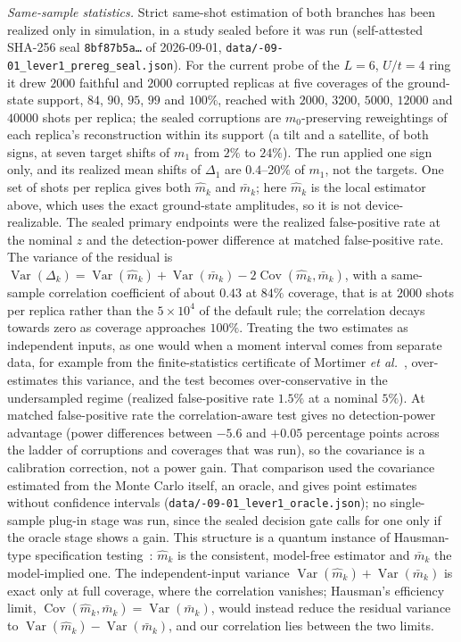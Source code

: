 \documentclass[aps,prb,onecolumn,superscriptaddress,longbibliography,floatfix]{revtex4-2}
\begin{document}
\emph{Same-sample statistics.} Strict same-shot estimation of both branches has been realized only in simulation, in a study sealed before it was run (self-attested SHA-256 seal \texttt{8bf87b5a\ldots} of 2026-09-01, \texttt{data/-09-01\_\allowbreak lever1\_\allowbreak prereg\_seal.json}). For the current probe of the $L=6$, $U/t=4$ ring it drew $2000$ faithful and $2000$ corrupted replicas at five coverages of the ground-state support, $84$, $90$, $95$, $99$ and $100\%$, reached with $2000$, $3200$, $5000$, $12000$ and $40000$ shots per replica; the sealed corruptions are $m_0$-preserving reweightings of each replica's reconstruction within its support (a tilt and a satellite, of both signs, at seven target shifts of $m_1$ from $2\%$ to $24\%$). The run applied one sign only, and its realized mean shifts of $\Delta_1$ are $0.4$--$20\%$ of $m_1$, not the targets. One set of shots per replica gives both $\widehat m_k$ and $\bar m_k$; here $\widehat m_k$ is the local estimator above, which uses the exact ground-state amplitudes, so it is not device-realizable. The sealed primary endpoints were the realized false-positive rate at the nominal $z$ and the detection-power difference at matched false-positive rate. The variance of the residual is $\operatorname{Var}(\Delta_k)=\operatorname{Var}(\widehat m_k)+\operatorname{Var}(\bar m_k)-2\operatorname{Cov}(\widehat m_k,\bar m_k)$, with a same-sample correlation coefficient of about $0.43$ at $84\%$ coverage, that is at $2000$ shots per replica rather than the $5\times10^4$ of the default rule; the correlation decays towards zero as coverage approaches $100\%$. Treating the two estimates as independent inputs, as one would when a moment interval comes from separate data, for example from the finite-statistics certificate of Mortimer \emph{et al.}~\cite{Mortimer2026}, over-estimates this variance, and the test becomes over-conservative in the undersampled regime (realized false-positive rate $1.5\%$ at a nominal $5\%$). At matched false-positive rate the correlation-aware test gives no detection-power advantage (power differences between $-5.6$ and $+0.05$ percentage points across the ladder of corruptions and coverages that was run), so the covariance is a calibration correction, not a power gain. That comparison used the covariance estimated from the Monte Carlo itself, an oracle, and gives point estimates without confidence intervals (\texttt{data/-09-01\_lever1\_oracle.json}); no single-sample plug-in stage was run, since the sealed decision gate calls for one only if the oracle stage shows a gain. This structure is a quantum instance of Hausman-type specification testing~\cite{Hausman1978}: $\widehat m_k$ is the consistent, model-free estimator and $\bar m_k$ the model-implied one. The independent-input variance $\operatorname{Var}(\widehat m_k)+\operatorname{Var}(\bar m_k)$ is exact only at full coverage, where the correlation vanishes; Hausman's efficiency limit, $\operatorname{Cov}(\widehat m_k,\bar m_k)=\operatorname{Var}(\bar m_k)$, would instead reduce the residual variance to $\operatorname{Var}(\widehat m_k)-\operatorname{Var}(\bar m_k)$, and our correlation lies between the two limits.
\end{document}
